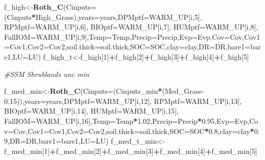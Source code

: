 \documentclass[
  10pt,
  b5paper,
]{book}
\newenvironment{Shaded}{\begin{snugshade}}{\end{snugshade}}
\newcommand{\CommentTok}[1]{\textcolor[rgb]{0.56,0.35,0.01}{\textit{#1}}}
\newcommand{\DataTypeTok}[1]{\textcolor[rgb]{0.13,0.29,0.53}{#1}}
\newcommand{\DecValTok}[1]{\textcolor[rgb]{0.00,0.00,0.81}{#1}}
\newcommand{\FloatTok}[1]{\textcolor[rgb]{0.00,0.00,0.81}{#1}}
\newcommand{\KeywordTok}[1]{\textcolor[rgb]{0.13,0.29,0.53}{\textbf{#1}}}
\newcommand{\NormalTok}[1]{#1}
\newcommand{\OperatorTok}[1]{\textcolor[rgb]{0.81,0.36,0.00}{\textbf{#1}}}
\begin{document}
\begin{Shaded}
\begin{Highlighting}[]
{\NormalTok{f_high<-}\KeywordTok{Roth_C}\NormalTok{(}\DataTypeTok{Cinputs=}\NormalTok{(Cinputs}\OperatorTok{*}\NormalTok{High_Grass),}\DataTypeTok{years=}\NormalTok{years,}\DataTypeTok{DPMptf=}\NormalTok{WARM_UP[i,}\DecValTok{5}\NormalTok{], }\DataTypeTok{RPMptf=}\NormalTok{WARM_UP[i,}\DecValTok{6}\NormalTok{], }\DataTypeTok{BIOptf=}\NormalTok{WARM_UP[i,}\DecValTok{7}\NormalTok{], }\DataTypeTok{HUMptf=}\NormalTok{WARM_UP[i,}\DecValTok{8}\NormalTok{], }\DataTypeTok{FallIOM=}\NormalTok{WARM_UP[i,}\DecValTok{9}\NormalTok{],}\DataTypeTok{Temp=}\NormalTok{Temp,}\DataTypeTok{Precip=}\NormalTok{Precip,}\DataTypeTok{Evp=}\NormalTok{Evp,}\DataTypeTok{Cov=}\NormalTok{Cov,}\DataTypeTok{Cov1=}\NormalTok{Cov1,}\DataTypeTok{Cov2=}\NormalTok{Cov2,}\DataTypeTok{soil.thick=}\NormalTok{soil.thick,}\DataTypeTok{SOC=}\NormalTok{SOC,}\DataTypeTok{clay=}\NormalTok{clay,}\DataTypeTok{DR=}\NormalTok{DR,}\DataTypeTok{bare1=}\NormalTok{bare1,}\DataTypeTok{LU=}\NormalTok{LU)}
\NormalTok{f_high_t<-f_high[}\DecValTok{1}\NormalTok{]}\OperatorTok{+}\NormalTok{f_high[}\DecValTok{2}\NormalTok{]}\OperatorTok{+}\NormalTok{f_high[}\DecValTok{3}\NormalTok{]}\OperatorTok{+}\NormalTok{f_high[}\DecValTok{4}\NormalTok{]}\OperatorTok{+}\NormalTok{f_high[}\DecValTok{5}\NormalTok{]}

\CommentTok{#SSM Shrublands unc min}

\NormalTok{f_med_min<-}\KeywordTok{Roth_C}\NormalTok{(}\DataTypeTok{Cinputs=}\NormalTok{(Cinputs_min}\OperatorTok{*}\NormalTok{(Med_Grass}\FloatTok{-0.15}\NormalTok{)),}\DataTypeTok{years=}\NormalTok{years,}\DataTypeTok{DPMptf=}\NormalTok{WARM_UP[i,}\DecValTok{12}\NormalTok{], }\DataTypeTok{RPMptf=}\NormalTok{WARM_UP[i,}\DecValTok{13}\NormalTok{], }\DataTypeTok{BIOptf=}\NormalTok{WARM_UP[i,}\DecValTok{14}\NormalTok{], }\DataTypeTok{HUMptf=}\NormalTok{WARM_UP[i,}\DecValTok{15}\NormalTok{], }\DataTypeTok{FallIOM=}\NormalTok{WARM_UP[i,}\DecValTok{16}\NormalTok{],}\DataTypeTok{Temp=}\NormalTok{Temp}\OperatorTok{*}\FloatTok{1.02}\NormalTok{,}\DataTypeTok{Precip=}\NormalTok{Precip}\OperatorTok{*}\FloatTok{0.95}\NormalTok{,}\DataTypeTok{Evp=}\NormalTok{Evp,}\DataTypeTok{Cov=}\NormalTok{Cov,}\DataTypeTok{Cov1=}\NormalTok{Cov1,}\DataTypeTok{Cov2=}\NormalTok{Cov2,}\DataTypeTok{soil.thick=}\NormalTok{soil.thick,}\DataTypeTok{SOC=}\NormalTok{SOC}\OperatorTok{*}\FloatTok{0.8}\NormalTok{,}\DataTypeTok{clay=}\NormalTok{clay}\OperatorTok{*}\FloatTok{0.9}\NormalTok{,}\DataTypeTok{DR=}\NormalTok{DR,}\DataTypeTok{bare1=}\NormalTok{bare1,}\DataTypeTok{LU=}\NormalTok{LU)}
\NormalTok{f_med_t_min<-f_med_min[}\DecValTok{1}\NormalTok{]}\OperatorTok{+}\NormalTok{f_med_min[}\DecValTok{2}\NormalTok{]}\OperatorTok{+}\NormalTok{f_med_min[}\DecValTok{3}\NormalTok{]}\OperatorTok{+}\NormalTok{f_med_min[}\DecValTok{4}\NormalTok{]}\OperatorTok{+}\NormalTok{f_med_min[}\DecValTok{5}\NormalTok{]}

}
\end{Highlighting}
\end{Shaded}
\end{document}
